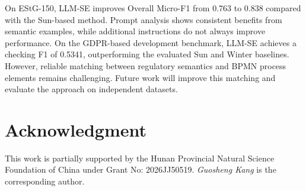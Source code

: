 \documentclass[conference]{IEEEtran}
\begin{document}
On EStG-150, LLM-SE improves Overall Micro-F1 from 0.763 to 0.838 compared with the Sun-based method. Prompt analysis shows consistent benefits from semantic examples, while additional instructions do not always improve performance. On the GDPR-based development benchmark, LLM-SE achieves a checking F1 of 0.5341, outperforming the evaluated Sun and Winter baselines. However, reliable matching between regulatory semantics and BPMN process elements remains challenging. Future work will improve this matching and evaluate the approach on independent datasets.

\section*{Acknowledgment}

This work is partially supported by the Hunan Provincial Natural Science
Foundation of China under Grant No: 2026JJ50519.
\textit{Guosheng Kang} is the corresponding author.



\end{document}
